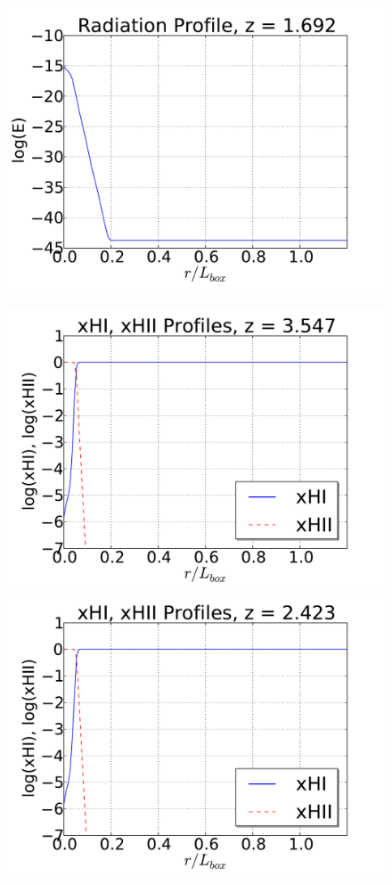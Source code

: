 \begin{figure}[t]
{  \includegraphics[scale=0.3, trim=1.0cm 1.0cm 1.0cm 0.5cm]{sg-Eprofiles_10.pdf}
  \hfill}
\centerline{\hfill
  \includegraphics[scale=0.3, trim=1.0cm 0.5cm 1.0cm 0.5cm]{sg-profiles_01.pdf}
  \includegraphics[scale=0.3, trim=1.0cm 0.5cm 1.0cm 0.5cm]{sg-profiles_05.pdf}
}
\end{figure}
